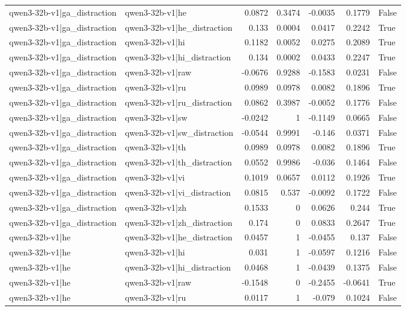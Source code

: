 \begin{table}
\begin{tabular}{l l r r r r l}
qwen3-32b-v1|ga_distraction & qwen3-32b-v1|he & 0.0872 & 0.3474 & -0.0035 & 0.1779 & False \\
qwen3-32b-v1|ga_distraction & qwen3-32b-v1|he_distraction & 0.133 & 0.0004 & 0.0417 & 0.2242 & True \\
qwen3-32b-v1|ga_distraction & qwen3-32b-v1|hi & 0.1182 & 0.0052 & 0.0275 & 0.2089 & True \\
qwen3-32b-v1|ga_distraction & qwen3-32b-v1|hi_distraction & 0.134 & 0.0002 & 0.0433 & 0.2247 & True \\
qwen3-32b-v1|ga_distraction & qwen3-32b-v1|raw & -0.0676 & 0.9288 & -0.1583 & 0.0231 & False \\
qwen3-32b-v1|ga_distraction & qwen3-32b-v1|ru & 0.0989 & 0.0978 & 0.0082 & 0.1896 & True \\
qwen3-32b-v1|ga_distraction & qwen3-32b-v1|ru_distraction & 0.0862 & 0.3987 & -0.0052 & 0.1776 & False \\
qwen3-32b-v1|ga_distraction & qwen3-32b-v1|sw & -0.0242 & 1 & -0.1149 & 0.0665 & False \\
qwen3-32b-v1|ga_distraction & qwen3-32b-v1|sw_distraction & -0.0544 & 0.9991 & -0.146 & 0.0371 & False \\
qwen3-32b-v1|ga_distraction & qwen3-32b-v1|th & 0.0989 & 0.0978 & 0.0082 & 0.1896 & True \\
qwen3-32b-v1|ga_distraction & qwen3-32b-v1|th_distraction & 0.0552 & 0.9986 & -0.036 & 0.1464 & False \\
qwen3-32b-v1|ga_distraction & qwen3-32b-v1|vi & 0.1019 & 0.0657 & 0.0112 & 0.1926 & True \\
qwen3-32b-v1|ga_distraction & qwen3-32b-v1|vi_distraction & 0.0815 & 0.537 & -0.0092 & 0.1722 & False \\
qwen3-32b-v1|ga_distraction & qwen3-32b-v1|zh & 0.1533 & 0 & 0.0626 & 0.244 & True \\
qwen3-32b-v1|ga_distraction & qwen3-32b-v1|zh_distraction & 0.174 & 0 & 0.0833 & 0.2647 & True \\
qwen3-32b-v1|he & qwen3-32b-v1|he_distraction & 0.0457 & 1 & -0.0455 & 0.137 & False \\
qwen3-32b-v1|he & qwen3-32b-v1|hi & 0.031 & 1 & -0.0597 & 0.1216 & False \\
qwen3-32b-v1|he & qwen3-32b-v1|hi_distraction & 0.0468 & 1 & -0.0439 & 0.1375 & False \\
qwen3-32b-v1|he & qwen3-32b-v1|raw & -0.1548 & 0 & -0.2455 & -0.0641 & True \\
qwen3-32b-v1|he & qwen3-32b-v1|ru & 0.0117 & 1 & -0.079 & 0.1024 & False \\

\end{tabular}
\end{table}
